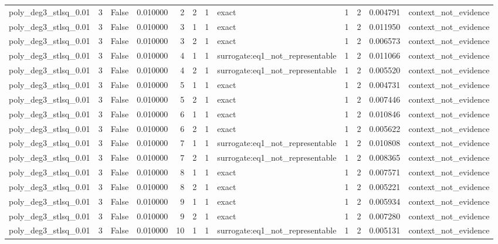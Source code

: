 \begin{tabular}{lrrrrrrlrrrl}
poly\_deg3\_stlsq\_0.01 & 3 & False & 0.010000 & 2 & 2 & 1 & exact & 1 & 2 & 0.004791 & context\_not\_evidence \\
poly\_deg3\_stlsq\_0.01 & 3 & False & 0.010000 & 3 & 1 & 1 & exact & 1 & 2 & 0.011950 & context\_not\_evidence \\
poly\_deg3\_stlsq\_0.01 & 3 & False & 0.010000 & 3 & 2 & 1 & exact & 1 & 2 & 0.006573 & context\_not\_evidence \\
poly\_deg3\_stlsq\_0.01 & 3 & False & 0.010000 & 4 & 1 & 1 & surrogate:eq1\_not\_representable & 1 & 2 & 0.011066 & context\_not\_evidence \\
poly\_deg3\_stlsq\_0.01 & 3 & False & 0.010000 & 4 & 2 & 1 & surrogate:eq1\_not\_representable & 1 & 2 & 0.005520 & context\_not\_evidence \\
poly\_deg3\_stlsq\_0.01 & 3 & False & 0.010000 & 5 & 1 & 1 & exact & 1 & 2 & 0.004731 & context\_not\_evidence \\
poly\_deg3\_stlsq\_0.01 & 3 & False & 0.010000 & 5 & 2 & 1 & exact & 1 & 2 & 0.007446 & context\_not\_evidence \\
poly\_deg3\_stlsq\_0.01 & 3 & False & 0.010000 & 6 & 1 & 1 & exact & 1 & 2 & 0.010846 & context\_not\_evidence \\
poly\_deg3\_stlsq\_0.01 & 3 & False & 0.010000 & 6 & 2 & 1 & exact & 1 & 2 & 0.005622 & context\_not\_evidence \\
poly\_deg3\_stlsq\_0.01 & 3 & False & 0.010000 & 7 & 1 & 1 & surrogate:eq1\_not\_representable & 1 & 2 & 0.010808 & context\_not\_evidence \\
poly\_deg3\_stlsq\_0.01 & 3 & False & 0.010000 & 7 & 2 & 1 & surrogate:eq1\_not\_representable & 1 & 2 & 0.008365 & context\_not\_evidence \\
poly\_deg3\_stlsq\_0.01 & 3 & False & 0.010000 & 8 & 1 & 1 & exact & 1 & 2 & 0.007571 & context\_not\_evidence \\
poly\_deg3\_stlsq\_0.01 & 3 & False & 0.010000 & 8 & 2 & 1 & exact & 1 & 2 & 0.005221 & context\_not\_evidence \\
poly\_deg3\_stlsq\_0.01 & 3 & False & 0.010000 & 9 & 1 & 1 & exact & 1 & 2 & 0.005934 & context\_not\_evidence \\
poly\_deg3\_stlsq\_0.01 & 3 & False & 0.010000 & 9 & 2 & 1 & exact & 1 & 2 & 0.007280 & context\_not\_evidence \\
poly\_deg3\_stlsq\_0.01 & 3 & False & 0.010000 & 10 & 1 & 1 & surrogate:eq1\_not\_representable & 1 & 2 & 0.005131 & context\_not\_evidence \\

\end{tabular}
